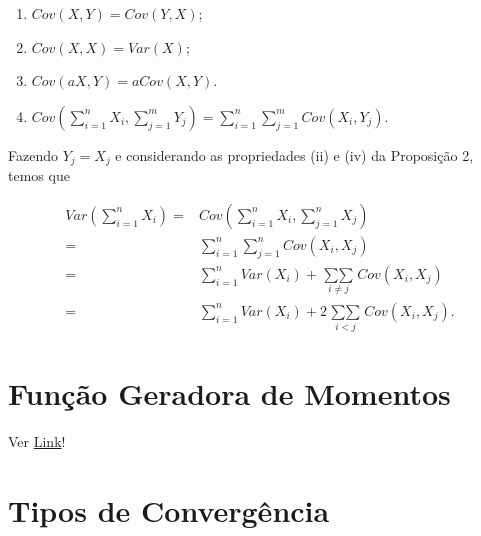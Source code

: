 \documentclass[
  letterpaper,
  DIV=11,
  numbers=noendperiod]{scrreprt}
\begin{document}
\begin{tcolorbox}[enhanced jigsaw, colback=white, leftrule=.75mm, colbacktitle=quarto-callout-note-color!10!white, breakable, titlerule=0mm, bottomtitle=1mm, title=\textcolor{quarto-callout-note-color}{\faInfo}\hspace{0.5em}{Proposição 2:}, colframe=quarto-callout-note-color-frame, toprule=.15mm, opacityback=0, bottomrule=.15mm, opacitybacktitle=0.6, arc=.35mm, toptitle=1mm, rightrule=.15mm, coltitle=black, left=2mm]

\begin{enumerate}
\def\labelenumi{\roman{enumi})}
\item
  \(Cov(X,Y) = Cov(Y,X)\);
\item
  \(Cov(X,X) = Var(X)\);
\item
  \(Cov(aX, Y) = a Cov(X,Y)\).
\item
  \(Cov\left(\sum\limits_{i=1}^{n} X_i,\sum\limits_{j=1}^{m} Y_j\right) = \sum\limits_{i=1}^{n}\sum\limits_{j=1}^{m}Cov(X_i,Y_j)\).
\end{enumerate}

\end{tcolorbox}

Fazendo \(Y_j = X_j\) e considerando as propriedades (ii) e (iv) da
Proposição 2, temos que

\[\begin{aligned}Var\left(\sum\limits_{i=1}^{n} X_i\right) =& Cov\left(\sum\limits_{i=1}^{n} X_i,\sum\limits_{j=1}^{n} X_j\right)\\ =& \sum\limits_{i=1}^{n}\sum\limits_{j=1}^{n}Cov(X_i,X_j)\\
=&\sum\limits_{i=1}^{n} Var(X_i) + \mathop{\sum\sum}\limits_{i\neq j}Cov(X_i,X_j)\\
=&\sum\limits_{i=1}^{n} Var(X_i) + 2\mathop{\sum\sum}\limits_{i < j}Cov(X_i,X_j).
\end{aligned}\]

\section{Função Geradora de
Momentos}\label{funuxe7uxe3o-geradora-de-momentos}

Ver
\href{https://www.ime.usp.br/~leorolla/probabilidade/Ch10.S1.html}{Link}!

\section{Tipos de Convergência}\label{tipos-de-converguxeancia}
\end{document}
